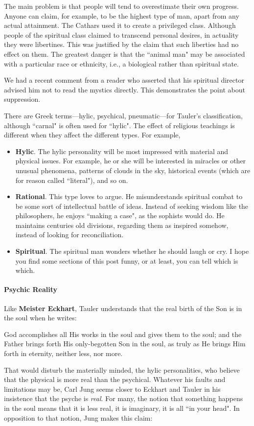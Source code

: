 The main problem is that people will tend to overestimate their own progress. Anyone can claim, for example, to be the highest type of man, apart from any actual attainment. The Cathars used it to create a privileged class. Although people of the spiritual class claimed to transcend personal desires, in actuality they were libertines. This was justified by the claim that such liberties had no effect on them. The greatest danger is that the ``animal man" may be associated with a particular race or ethnicity, i.e., a biological rather than spiritual state.

We had a recent comment from a reader who asserted that his spiritual director advised him not to read the mystics directly. This demonstrates the point about suppression.

There are Greek terms—hylic, psychical, pneumatic—for Tauler's classification, although ``carnal" is often used for ``hylic". The effect of religious teachings is different when they affect the different types. For example,

\begin{itemize}
\item \textbf{Hylic}. The hylic personality will be most impressed with material and physical issues. For example, he or she will be interested in miracles or other unusual phenomena, patterns of clouds in the sky, historical events (which are for reason called ``literal"), and so on. 
\item \textbf{Rational}. This type loves to argue. He misunderstands spiritual combat to be some sort of intellectual battle of ideas. Instead of seeking wisdom like the philosophers, he enjoys ``making a case", as the sophists would do. He maintains centuries old divisions, regarding them as inspired somehow, instead of looking for reconciliation. 
\item \textbf{Spiritual}. The spiritual man wonders whether he should laugh or cry. I hope you find some sections of this post funny, or at least, you can tell which is which. 
\end{itemize}
\paragraph{Psychic Reality}
Like \textbf{Meister Eckhart}, Tauler understands that the real birth of the Son is in the soul when he writes:

\begin{quotex}
God accomplishes all His works in the soul and gives them to the soul; and the Father brings forth His only-begotten Son in the soul, as truly as He brings Him forth in eternity, neither less, nor more. 

\end{quotex}
That would disturb the materially minded, the hylic personalities, who believe that the physical is more real than the psychical. Whatever his faults and limitations may be, Carl Jung seems closer to Eckhart and Tauler in his insistence that the psyche is \emph{real}. For many, the notion that something happens in the soul means that it is less real, it is imaginary, it is all ``in your head". In opposition to that notion, Jung makes this claim:


